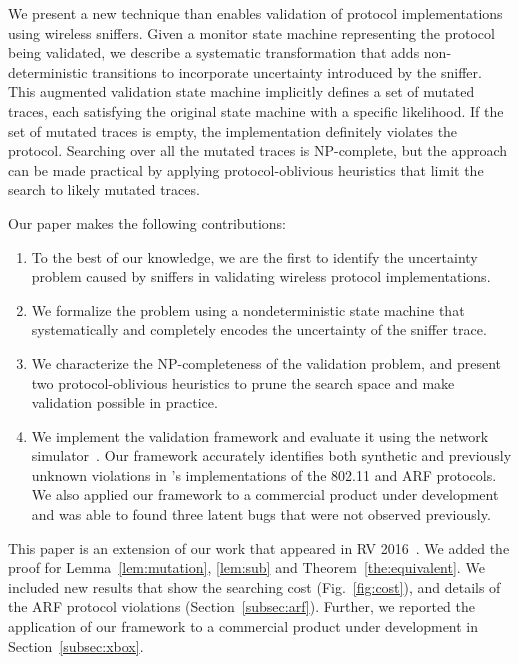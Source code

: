 We present a new technique than enables validation of protocol implementations using
wireless sniffers. Given a monitor state machine representing the protocol being
validated, we describe a systematic transformation that adds non-deterministic
transitions to incorporate uncertainty introduced by the sniffer. This
augmented validation state machine implicitly defines a set of
mutated traces, each satisfying the original state machine with a specific
likelihood. If the set of mutated traces is empty, the implementation definitely violates the
protocol. Searching over all the mutated traces is NP-complete, but the approach
can be made practical by applying protocol-oblivious heuristics that limit the
search to likely mutated traces.

Our paper makes the following contributions:
\begin{enumerate}
  \item To the best of our knowledge, we are the first to identify the
    uncertainty problem caused by sniffers in validating wireless protocol
    implementations.
  \item We formalize the problem using a nondeterministic state machine that
    systematically and completely encodes the uncertainty of the
    sniffer trace.
  \item We characterize the NP-completeness of the validation problem, and
    present two protocol-oblivious heuristics to prune the search space and make
    validation possible in practice.
  \item We implement the validation framework and evaluate it using the \ns{}
    network simulator~\cite{riley2010ns}. Our framework accurately identifies
    both synthetic and previously unknown violations in \ns{}'s implementations
    of the 802.11 and ARF protocols.  We also applied our framework to a
    commercial product under development and was able to found three latent bugs
    that were not observed previously.
\end{enumerate}

This paper is an extension of our work that appeared in RV 2016~\cite{Shi2016}.
We added the proof for Lemma~\ref{lem:mutation}, \ref{lem:sub} and
Theorem~\ref{the:equivalent}. We included new results that show the searching
cost (Fig.~\ref{fig:cost}), and details of the ARF protocol violations
(Section~\ref{subsec:arf}). Further, we reported the application of our
framework to a commercial product under development in
Section~\ref{subsec:xbox}.

